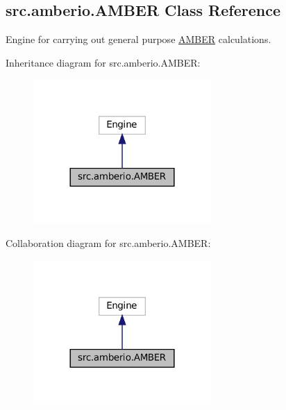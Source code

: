 \hypertarget{classsrc_1_1amberio_1_1AMBER}{}\subsection{src.\+amberio.\+A\+M\+B\+ER Class Reference}
\label{classsrc_1_1amberio_1_1AMBER}


Engine for carrying out general purpose \hyperlink{classsrc_1_1amberio_1_1AMBER}{A\+M\+B\+ER} calculations.  




Inheritance diagram for src.\+amberio.\+A\+M\+B\+ER\+:
\nopagebreak
\begin{figure}[H]
\begin{center}
\leavevmode
\includegraphics[width=192pt]{classsrc_1_1amberio_1_1AMBER__inherit__graph}
\end{center}
\end{figure}


Collaboration diagram for src.\+amberio.\+A\+M\+B\+ER\+:
\nopagebreak
\begin{figure}[H]
\begin{center}
\leavevmode
\includegraphics[width=192pt]{classsrc_1_1amberio_1_1AMBER__coll__graph}
\end{center}
\end{figure}
